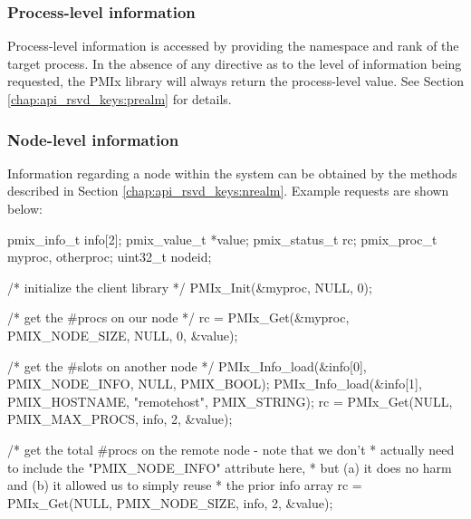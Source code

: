 \subsubsection{Process-level information}

Process-level information is accessed by providing the namespace and rank of the target process. In the absence of any directive as to the level of information being requested, the \ac{PMIx} library will always return the process-level value. See Section \ref{chap:api_rsvd_keys:prealm} for details.


\subsubsection{Node-level information}

Information regarding a node within the system can be obtained by the methods described in Section \ref{chap:api_rsvd_keys:nrealm}. Example requests are shown below:

\cspecificstart
\begin{codepar}
pmix_info_t info[2];
pmix_value_t *value;
pmix_status_t rc;
pmix_proc_t myproc, otherproc;
uint32_t nodeid;

/* initialize the client library */
PMIx_Init(&myproc, NULL, 0);

/* get the #procs on our node */
rc = PMIx_Get(&myproc, PMIX_NODE_SIZE, NULL, 0, &value);

/* get the #slots on another node */
PMIx_Info_load(&info[0], PMIX_NODE_INFO, NULL, PMIX_BOOL);
PMIx_Info_load(&info[1], PMIX_HOSTNAME, "remotehost", PMIX_STRING);
rc = PMIx_Get(NULL, PMIX_MAX_PROCS, info, 2, &value);

/* get the total #procs on the remote node - note that we don't
 * actually need to include the "PMIX_NODE_INFO" attribute here,
 * but (a) it does no harm and (b) it allowed us to simply reuse
 * the prior info array
rc = PMIx_Get(NULL, PMIX_NODE_SIZE, info, 2, &value);
\end{codepar}
\cspecificend

